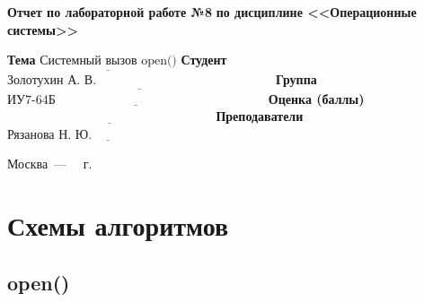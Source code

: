 \documentclass[12pt]{report}
\begin{document}
\begin{titlepage}
		\begin{center}
			\noindent\begin{minipage}{1.1\textwidth}\centering
				\Large\textbf{  Отчет по лабораторной работе №8}\newline
				\textbf{по дисциплине <<Операционные системы>>}\newline
			\end{minipage}
		\end{center}
		
		\noindent\textbf{Тема} $\underline{\text{Системный вызов open()}}$\newline\newline
		\noindent\textbf{Студент} $\underline{\text{Золотухин А. В.~~~~~~~~~~~~~~~~~~~~~~~~~~~~~~~~~~~~~~~~~~}}$\newline\newline
		\noindent\textbf{Группа} $\underline{\text{ИУ7-64Б~~~~~~~~~~~~~~~~~~~~~~~~~~~~~~~~~~~~~~~~~~~~~~~~~~}}$\newline\newline
		\noindent\textbf{Оценка (баллы)} $\underline{\text{~~~~~~~~~~~~~~~~~~~~~~~~~~~~~~~~~~~~~~~~~~~~~~~~~}}$\newline\newline
		\noindent\textbf{Преподаватели} $\underline{\text{Рязанова Н. Ю.~~~~~~~~~~~~~~~~~~~~~~~~~~~~}}$\newline\newline\newline
		
		\begin{center}
			\vfill
			Москва~---~\the\year
			~г.
		\end{center}
	\end{titlepage}
	
	\chapter{Схемы алгоритмов}
	
	\section{open()}
	
\end{document}
